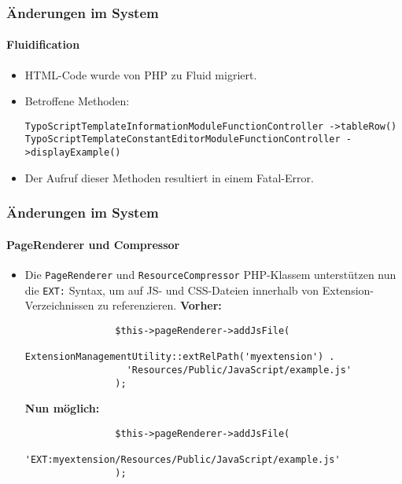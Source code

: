 \begin{frame}[fragile]
	\frametitle{Änderungen im System}
	\framesubtitle{Fluidification}

	\begin{itemize}
		\item HTML-Code wurde von PHP zu Fluid migriert.
		\item Betroffene Methoden:\newline

			\smaller\texttt{TypoScriptTemplateInformationModuleFunctionController\newline
				->tableRow()}\normalsize\newline
			\smaller\texttt{TypoScriptTemplateConstantEditorModuleFunctionController\newline
				->displayExample()}\normalsize

		\item Der Aufruf dieser Methoden resultiert in einem Fatal-Error.

	\end{itemize}

\end{frame}


\begin{frame}[fragile]
	\frametitle{Änderungen im System}
	\framesubtitle{PageRenderer und Compressor}

	\lstset{basicstyle=\smaller\ttfamily}

	\begin{itemize}

		\item Die \texttt{PageRenderer} und \texttt{ResourceCompressor} PHP-Klassem unterstützen nun die
			\texttt{EXT:} Syntax, um auf JS- und CSS-Dateien innerhalb von Extension-Verzeichnissen zu referenzieren.\newline
			\textbf{Vorher:}

			\begin{lstlisting}
				$this->pageRenderer->addJsFile(
				  ExtensionManagementUtility::extRelPath('myextension') .
				  'Resources/Public/JavaScript/example.js'
				);
			\end{lstlisting}

			\textbf{Nun möglich:}

			\begin{lstlisting}
				$this->pageRenderer->addJsFile(
				  'EXT:myextension/Resources/Public/JavaScript/example.js'
				);
			\end{lstlisting}

	\end{itemize}

\end{frame}

